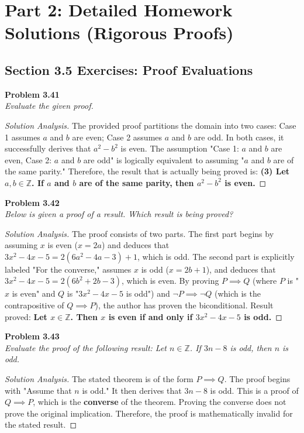 \documentclass[11pt, letterpaper]{article}
\theoremstyle{definition}
\theoremstyle{remark}
\newcommand{\Z}{\mathbb{Z}}
\begin{document}
\newpage

\section{Part 2: Detailed Homework Solutions (Rigorous Proofs)}

\subsection{Section 3.5 Exercises: Proof Evaluations}

\textbf{Problem 3.41} \\
\textit{Evaluate the given proof.}
\begin{proof}[Solution Analysis]
The provided proof partitions the domain into two cases: Case 1 assumes $a$ and $b$ are even; Case 2 assumes $a$ and $b$ are odd. In both cases, it successfully derives that $a^2 - b^2$ is even. 
The assumption "Case 1: $a$ and $b$ are even, Case 2: $a$ and $b$ are odd" is logically equivalent to assuming "$a$ and $b$ are of the same parity."
Therefore, the result that is actually being proved is: \textbf{(3) Let $a, b \in \Z$. If $a$ and $b$ are of the same parity, then $a^2 - b^2$ is even.}
\end{proof}

\textbf{Problem 3.42} \\
\textit{Below is given a proof of a result. Which result is being proved?}
\begin{proof}[Solution Analysis]
The proof consists of two parts. The first part begins by assuming $x$ is even ($x=2a$) and deduces that $3x^2 - 4x - 5 = 2(6a^2 - 4a - 3) + 1$, which is odd. 
The second part is explicitly labeled "For the converse," assumes $x$ is odd ($x=2b+1$), and deduces that $3x^2 - 4x - 5 = 2(6b^2 + 2b - 3)$, which is even. 
By proving $P \implies Q$ (where $P$ is "$x$ is even" and $Q$ is "$3x^2 - 4x - 5$ is odd") and $\neg P \implies \neg Q$ (which is the contrapositive of $Q \implies P$), the author has proven the biconditional.
Result proved: \textbf{Let $x \in \Z$. Then $x$ is even if and only if $3x^2 - 4x - 5$ is odd.}
\end{proof}

\textbf{Problem 3.43} \\
\textit{Evaluate the proof of the following result: Let $n \in \Z$. If $3n-8$ is odd, then $n$ is odd.}
\begin{proof}[Solution Analysis]
The stated theorem is of the form $P \implies Q$. The proof begins with "Assume that $n$ is odd." It then derives that $3n-8$ is odd. This is a proof of $Q \implies P$, which is the \textbf{converse} of the theorem. Proving the converse does not prove the original implication. Therefore, the proof is mathematically invalid for the stated result.
\end{proof}
\end{document}
